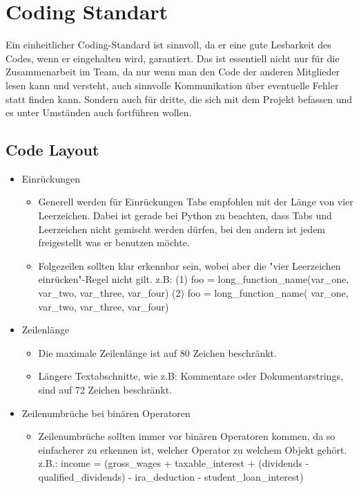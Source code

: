 \section{Coding Standart}
Ein einheitlicher Coding-Standard ist sinnvoll, da er eine gute Lesbarkeit des Codes, wenn er eingehalten wird, garantiert. Das ist essentiell nicht nur für die Zusammenarbeit im Team, da nur wenn man den Code der anderen Mitglieder lesen kann und versteht, auch sinnvolle Kommunikation über eventuelle Fehler statt finden kann. Sondern auch für dritte, die sich mit dem Projekt befassen und es unter Umständen auch fortführen wollen.

\subsection{Code Layout}
\begin{itemize}
\item Einrückungen
\begin{itemize}
\item Generell werden für Einrückungen Tabs empfohlen mit der Länge von vier Leerzeichen. Dabei ist gerade bei Python zu beachten, dass Tabs und Leerzeichen nicht gemischt werden dürfen, bei den andern ist jedem freigestellt was er benutzen möchte.
\item Folgezeilen sollten klar erkennbar sein, wobei aber die "vier Leerzeichen einrücken"-Regel nicht gilt.
z.B: 
(1) foo = long_function_name(var_one, var_two,
                         	 var_three, var_four)
(2) foo = long_function_name(
  	  var_one, var_two,
  	  var_three, var_four)                      
\end{itemize}
\item Zeilenlänge
\begin{itemize}
\item Die maximale Zeilenlänge ist auf 80 Zeichen beschränkt. 
\item Längere Textabschnitte, wie z.B: Kommentare oder Dokumentarstrings, sind auf 72 Zeichen beschränkt.
\end{itemize}
\item Zeilenumbrüche bei binären Operatoren
\begin{itemize}
\item Zeilenumbrüche sollten immer vor binären Operatoren kommen, da so einfacherer zu erkennen ist, welcher Operator zu welchem Objekt gehört.
z.B.: income = (gross_wages
         				 + taxable_interest
         				 + (dividends - qualified_dividends)
         				 - ira_deduction
         				 - student_loan_interest)

\end{itemize}
\end{itemize}
